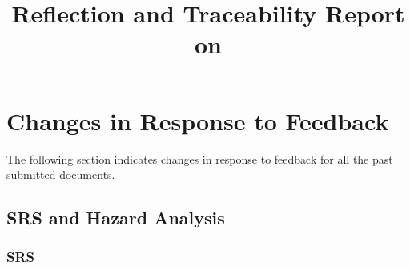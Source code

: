 \documentclass{article}
\title{Reflection and Traceability Report on \progname}
\author{\authname}
\date{}
\begin{document}
\maketitle

\section{Changes in Response to Feedback}
\hspace{2em}The following section indicates changes in response to feedback for all the past submitted documents.

\subsection{SRS and Hazard Analysis}

\subsubsection{SRS}
\end{document}
